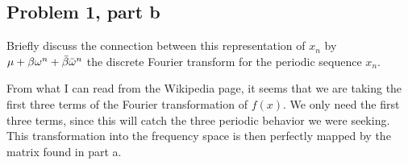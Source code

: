 \newpage
\subsection{Problem 1, part b}
Briefly discuss the connection between this representation of $x_n$ by $\mu + \beta\omega^n + \Bar{\beta}\Bar{\omega}^n$ the discrete Fourier transform for the periodic sequence $x_n$.
\partbreak
\begin{solution}

    From what I can read from the Wikipedia page, it seems that we are taking the first three terms of the Fourier transformation of $f(x)$. We only need the first three terms, since this will catch the three periodic behavior we were seeking. This transformation into the frequency space is then perfectly mapped by the matrix found in part a. 
\end{solution}

